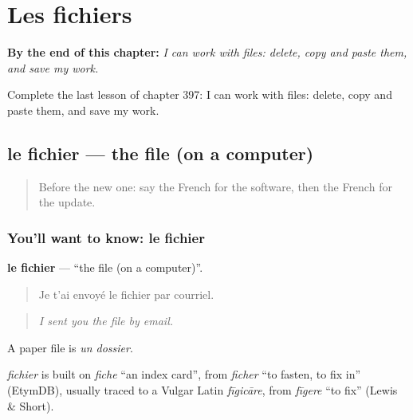 
\chapter{Les fichiers}
\label{ch:fr-les-fichiers}

\begin{chapteropening}
\textbf{By the end of this chapter:} \emph{I can work with files: delete, copy and paste them, and save my work.}

Complete the last lesson of chapter 397: I can work with files: delete, copy and paste them, and save my work.
\end{chapteropening}

\section[le fichier]{le fichier — the file (on a computer)}

\label{lesson:FR-C397-fichier}



\begin{quote}
Before the new one: say the French for the software, then the French for the update.
\end{quote}

\subsection*{You'll want to know: le fichier}
\textbf{le fichier} — \textquotedblleft{}the file (on a computer)\textquotedblright{}.

\begin{quote}
Je t'ai envoyé le fichier par courriel.
\end{quote}

\begin{quote}
\emph{I sent you the file by email.}
\end{quote}

A paper file is \emph{un dossier}.

\begin{cousinweb}
\emph{fichier} is built on \emph{fiche} \textquotedblleft{}an index card\textquotedblright{}, from \emph{ficher} \textquotedblleft{}to fasten, to fix in\textquotedblright{} (EtymDB), usually traced to a Vulgar Latin \emph{fīgicāre}, from \emph{fīgere} \textquotedblleft{}to fix\textquotedblright{} (Lewis \& Short).
\end{cousinweb}

